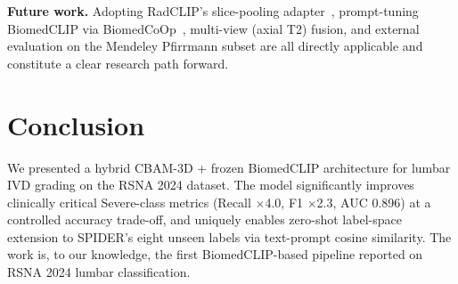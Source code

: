 \documentclass[conference]{IEEEtran}
\begin{document}
\textbf{Future work.} Adopting RadCLIP's slice-pooling
adapter~\cite{lu2024radclip}, prompt-tuning BiomedCLIP via
BiomedCoOp~\cite{koleilat2025biomedcoop}, multi-view (axial T2)
fusion, and external evaluation on the Mendeley Pfirrmann subset are
all directly applicable and constitute a clear research path forward.

\section{Conclusion}
\label{sec:concl}

We presented a hybrid CBAM-3D + frozen BiomedCLIP architecture for
lumbar IVD grading on the RSNA 2024 dataset. The model significantly
improves clinically critical Severe-class metrics (Recall
$\times$4.0, F1 $\times$2.3, AUC 0.896) at a controlled accuracy
trade-off, and uniquely enables zero-shot label-space extension to
SPIDER's eight unseen labels via text-prompt cosine similarity. The
work is, to our knowledge, the first BiomedCLIP-based pipeline
reported on RSNA 2024 lumbar classification.
\end{document}
